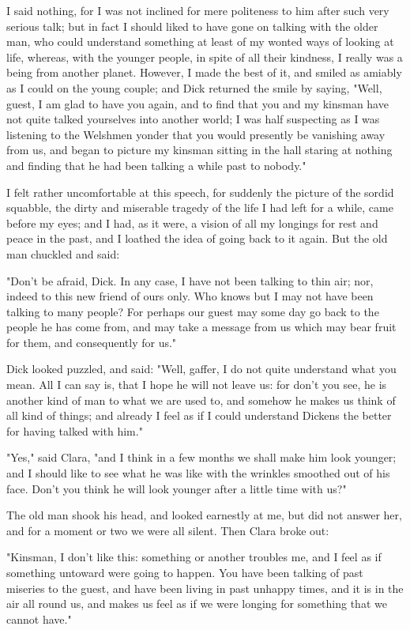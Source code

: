 I said nothing, for I was not inclined for mere politeness to him after
such very serious talk; but in fact I should liked to have gone on
talking with the older man, who could understand something at least of
my wonted ways of looking at life, whereas, with the younger people, in
spite of all their kindness, I really was a being from another planet.
However, I made the best of it, and smiled as amiably as I could on the
young couple; and Dick returned the smile by saying, "Well, guest, I am
glad to have you again, and to find that you and my kinsman have not
quite talked yourselves into another world; I was half suspecting as I
was listening to the Welshmen yonder that you would presently be
vanishing away from us, and began to picture my kinsman sitting in the
hall staring at nothing and finding that he had been talking a while
past to nobody."

I felt rather uncomfortable at this speech, for suddenly the picture of
the sordid squabble, the dirty and miserable tragedy of the life I had
left for a while, came before my eyes; and I had, as it were, a vision
of all my longings for rest and peace in the past, and I loathed the
idea of going back to it again. But the old man chuckled and said:

"Don't be afraid, Dick. In any case, I have not been talking to thin
air; nor, indeed to this new friend of ours only. Who knows but I may
not have been talking to many people? For perhaps our guest may some day
go back to the people he has come from, and may take a message from us
which may bear fruit for them, and consequently for us."

Dick looked puzzled, and said: "Well, gaffer, I do not quite understand
what you mean. All I can say is, that I hope he will not leave us: for
don't you see, he is another kind of man to what we are used to, and
somehow he makes us think of all kind of things; and already I feel as
if I could understand Dickens the better for having talked with him."

"Yes," said Clara, "and I think in a few months we shall make him look
younger; and I should like to see what he was like with the wrinkles
smoothed out of his face. Don't you think he will look younger after a
little time with us?"

The old man shook his head, and looked earnestly at me, but did not
answer her, and for a moment or two we were all silent. Then Clara broke
out:

"Kinsman, I don't like this: something or another troubles me, and I
feel as if something untoward were going to happen. You have been
talking of past miseries to the guest, and have been living in past
unhappy times, and it is in the air all round us, and makes us feel as
if we were longing for something that we cannot have."

